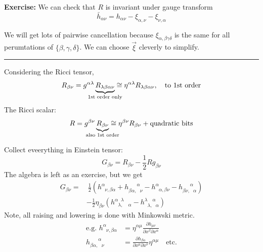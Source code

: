 \documentclass[a4paper]{article} %
\newcommand{\exercise}[2]
{
\begin{framed}
\textbf{Exercise:} #1 \\\hrule
#2
\end{framed}
}
\begin{document}
\exercise{We can check that $R$ is invariant under gauge transform
\begin{equation}
\bar{h}_{\alpha\nu}=h_{\alpha\nu}-\xi_{\alpha,\nu}-\xi_{\nu,\alpha}
\end{equation}

We will get lots of pairwise cancellation because $\xi_{\alpha,\beta \gamma\delta}$ is the same for all perumtations of $\{\beta,\gamma,\delta\}$. We can choose $\vec{\xi}$ cleverly to simplify.
}
{}

Considering the Ricci tensor,
\begin{equation}
R_{\beta\nu}=g^{\alpha\lambda} \underbrace{R_{\lambda\beta\alpha\nu}}_{\mathclap{\text{1st order only}}}
\cong \eta^{\alpha\lambda} R_{\lambda\beta\alpha\nu},\quad\text{to 1st order}
\end{equation}
The Ricci scalar:
\begin{equation}
R = g^{\beta\nu} \underbrace{R_{\beta\nu}}_{\mathclap{\text{also 1st order}}} \cong \eta^{\beta\nu} R_{\beta\nu}+
\text{quadratic bits}
\end{equation}

Collect eveerything in Einstein tensor:
\begin{equation}
G_{\beta\nu}=R_{\beta\nu}-\frac{1}{2}R g_{\beta\nu}
\end{equation}
The algebra is left as an exercise, but we get
\begin{align}
G_{\beta\nu}=&~\frac{1}{2}\left(h^{\alpha}_{\phantom{\alpha}\nu,\beta\alpha}+h_{\beta\alpha,\phantom{\alpha}\nu}
^{\phantom{\beta\alpha,}\alpha} - h^{\alpha}_{\phantom{\alpha}\alpha,\beta\nu}- h_{\beta\nu,\phantom{\alpha}\alpha}
^{\phantom{\beta\nu,}\alpha}\right)\\
&-\frac{1}{2}\eta_{\beta\nu}
\left( h^{\alpha\phantom{\lambda}\lambda}_{\phantom{\alpha}\lambda,\phantom{\lambda,}\alpha}
- h^{\lambda\phantom{\lambda,}\alpha}_{\phantom{\lambda}\lambda,\phantom{\alpha}\alpha}\right)
\end{align}
Note, all raising and lowering is done with Minkowski metric.
\begin{align}
\text{e.g. } h^{\alpha}_{\phantom{\alpha}\nu,\beta\alpha}&
=\eta^{\alpha\mu}\frac{\partial h_{\mu\nu}}{\partial x^{\beta}\partial x^{\alpha}}\\
h_{\beta\alpha,\phantom{\alpha}\nu}^{\phantom{\beta\alpha,}\alpha}&=
\frac{\partial h_{\beta\alpha}}{\partial x^{\mu} \partial x^{\nu}}\eta^{\alpha\mu}\quad\text{etc.}
\end{align}
\end{document}
